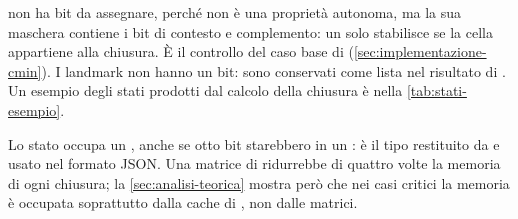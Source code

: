  non ha bit da assegnare, perché non è una proprietà autonoma,
ma la sua maschera contiene i bit di contesto e complemento: un solo
 stabilisce se la cella appartiene alla chiusura. È il
controllo del caso base di \cmin{} (\cref{sec:implementazione-cmin}).
I landmark non hanno un bit: sono conservati come lista nel risultato di
\cmin{}. Un esempio degli stati prodotti dal calcolo della chiusura è nella
\cref{tab:stati-esempio}.

Lo stato occupa un , anche se otto bit starebbero in un
: è il tipo restituito da  e usato nel
formato JSON. Una matrice di  ridurrebbe di quattro volte la
memoria di ogni chiusura; la \cref{sec:analisi-teorica} mostra però che nei
casi critici la memoria è occupata soprattutto dalla cache di \cmin{}, non
dalle matrici.
